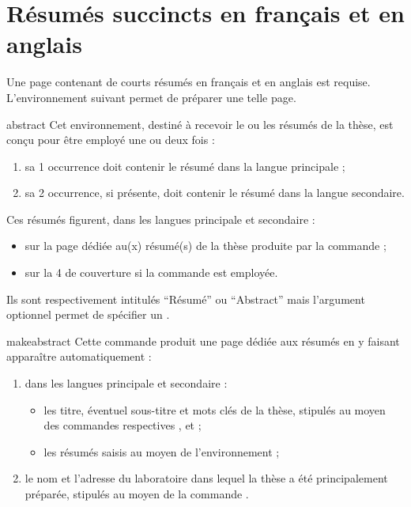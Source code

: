 \section{Résumés succincts en français et en anglais}\label{sec:abstract}

Une page contenant de courts résumés en français et en anglais est requise.
L'environnement  suivant permet de préparer une telle
page.
%
\begin{docEnvironment}[doclang/environment content=résumé,doc description=\mandatory]{abstract}{}
  Cet environnement, destiné à recevoir le ou les résumés de la thèse, est
  conçu pour être employé une ou deux fois :
  \begin{enumerate}
  \item sa 1\iere{} occurrence doit contenir le résumé dans la langue
    principale ;
  \item sa 2\ieme{} occurrence, si présente, doit contenir le résumé dans la
    langue secondaire.
  \end{enumerate}
  Ces résumés figurent, dans les langues principale et secondaire :
  \begin{itemize}
  \item sur la page dédiée au(x) résumé(s) de la thèse produite par la commande
     ;
  \item sur la 4\ieme{} de couverture si la commande  est
    employée.
  \end{itemize}
  Ils sont respectivement intitulés \enquote{Résumé} ou
  \foreignquote{english}{Abstract}\selonlangue{} mais l'argument optionnel
  permet de spécifier un \redefexprcle.
\end{docEnvironment}

\begin{docCommand}[doc description=\mandatory]{makeabstract}{}
  Cette commande produit une page dédiée aux résumés en y faisant
  apparaître automatiquement :
  \begin{enumerate}
  \item dans les langues principale et secondaire :
    \begin{itemize}
    \item les titre, éventuel sous-titre et mots clés de la thèse, stipulés au
      moyen des commandes respectives ,  et
       ;
    \item les résumés saisis au moyen de l'environnement  ;
    \end{itemize}
  \item le nom et l'adresse du laboratoire dans lequel la thèse a été
    principalement préparée, stipulés au moyen de la commande
    .
  \end{enumerate}
\end{docCommand}

